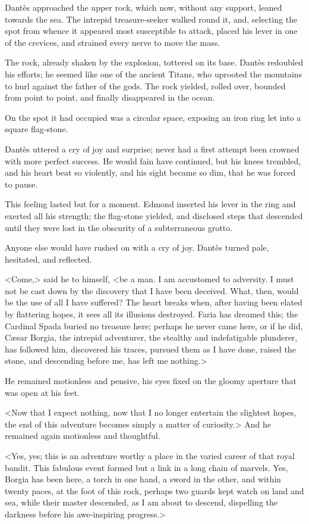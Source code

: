  Dantès approached the upper rock, which now, without any support, leaned towards the sea. The intrepid treasure-seeker walked round it, and, selecting the spot from whence it appeared most susceptible to attack, placed his lever in one of the crevices, and strained every nerve to move the mass. 

 The rock, already shaken by the explosion, tottered on its base. Dantès redoubled his efforts; he seemed like one of the ancient Titans, who uprooted the mountains to hurl against the father of the gods. The rock yielded, rolled over, bounded from point to point, and finally disappeared in the ocean. 

 On the spot it had occupied was a circular space, exposing an iron ring let into a square flag-stone. 

 Dantès uttered a cry of joy and surprise; never had a first attempt been crowned with more perfect success. He would fain have continued, but his knees trembled, and his heart beat so violently, and his sight became so dim, that he was forced to pause. 

 This feeling lasted but for a moment. Edmond inserted his lever in the ring and exerted all his strength; the flag-stone yielded, and disclosed steps that descended until they were lost in the obscurity of a subterraneous grotto. 

 Anyone else would have rushed on with a cry of joy. Dantès turned pale, hesitated, and reflected. 

 <Come,> said he to himself, <be a man. I am accustomed to adversity. I must not be cast down by the discovery that I have been deceived. What, then, would be the use of all I have suffered? The heart breaks when, after having been elated by flattering hopes, it sees all its illusions destroyed. Faria has dreamed this; the Cardinal Spada buried no treasure here; perhaps he never came here, or if he did, Cæsar Borgia, the intrepid adventurer, the stealthy and indefatigable plunderer, has followed him, discovered his traces, pursued them as I have done, raised the stone, and descending before me, has left me nothing.> 

 He remained motionless and pensive, his eyes fixed on the gloomy aperture that was open at his feet. 

 <Now that I expect nothing, now that I no longer entertain the slightest hopes, the end of this adventure becomes simply a matter of curiosity.> And he remained again motionless and thoughtful. 

 <Yes, yes; this is an adventure worthy a place in the varied career of that royal bandit. This fabulous event formed but a link in a long chain of marvels. Yes, Borgia has been here, a torch in one hand, a sword in the other, and within twenty paces, at the foot of this rock, perhaps two guards kept watch on land and sea, while their master descended, as I am about to descend, dispelling the darkness before his awe-inspiring progress.>

